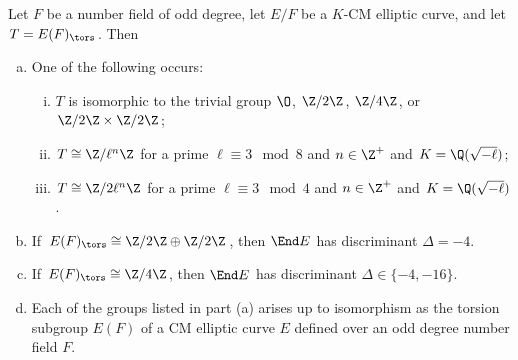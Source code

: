 \begin{frame}[plain]
\footnotesize
\begin{thm}
Let $F$ be a number field of odd degree, let $E/F$ be a $K$-CM elliptic curve, and let $T= E(F)_\tors$. Then
	\begin{enumerate}[(a)]
	\item One of the following occurs:
		\begin{enumerate}[(i)] \footnotesize
		\item $T$ is isomorphic to the trivial group $\O$, $\Z/2\Z$, $\Z/4\Z$, or $\Z/2\Z \times \Z/2\Z$;
		\item $T \cong \Z/\ell^n\Z$ for a prime $\ell \equiv 3 \mod 8$ and $n \in \Z^+$ and $K= \Q(\sqrt{-\ell})$;
		\item $T \cong \Z/2\ell^n\Z$ for a prime $\ell \equiv 3 \mod 4$ and $n \in \Z^+$ and $K= \Q(\sqrt{-\ell})$. 
		\end{enumerate}
	\item If $E(F)_\tors \cong \Z/2\Z \oplus \Z/2\Z$, then $\End E$ has discriminant $\Delta= -4$.
	\item If $E(F)_\tors \cong \Z/4\Z$, then $\End E$ has discriminant $\Delta \in \{ -4, -16 \}$.
	\item Each of the groups listed in part (a) arises up to isomorphism as the torsion subgroup $E(F)$ of a CM elliptic curve $E$ defined over an odd degree number field $F$. 
	\end{enumerate}
\end{thm}
	\begin{figure}[h]
	\centering
	\begin{subfigure}{0.30\textwidth}
	\captionsetup{labelformat=empty}
	\centering

\end{subfigure}
\end{figure}
\end{frame}
